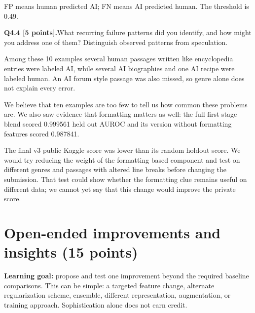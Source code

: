 \documentclass[11pt,letterpaper]{article}
\newcommand{\question}[2]{\needspace{4\baselineskip}\par\addvspace{0.45em}\noindent\textbf{#1}\quad #2\par\nobreak\vspace{0.1em}}
\newcommand{\smallnote}[1]{{\small\color{muted}#1}}
\begin{document}
\smallnote{FP means human predicted AI; FN means AI predicted human. The threshold is 0.49.}
\question{Q4.4 [5 points].}{What recurring failure patterns did you identify, and how might you address one of them? Distinguish observed patterns from speculation.}
Among these 10 examples several human passages written like encyclopedia entries were labeled AI, while several AI biographies and one AI recipe were labeled human. An AI forum style passage was also missed, so genre alone does not explain every error.
\newline

We believe that ten examples are too few to tell us how common these problems are. We also saw evidence that formatting matters as well: the full first stage blend scored 0.999561 held out AUROC and its version without formatting features scored 0.987841.
\newline

The final v3 public Kaggle score was lower than its random holdout score. We would try reducing the weight of the formatting based component and test on different genres and passages with altered line breaks before changing the submission. That test could show whether the formatting clue remains useful on different data; we cannot yet say that this change would improve the private score.
\newpage
\section{Open-ended improvements and insights (15 points)}
\textbf{Learning goal:} propose and test one improvement beyond the required baseline comparisons. This can be simple: a targeted feature change, alternate regularization scheme, ensemble, different representation, augmentation, or training approach. Sophistication alone does not earn credit.
\end{document}
